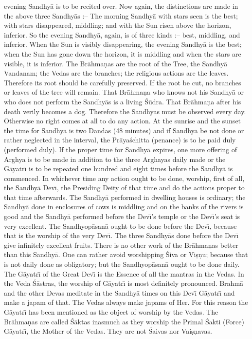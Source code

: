 evening Sandhy\=a is to be recited over. Now again, the distinctions are made in the above three Sandhy\=as :-- The morning Sandhy\=a with stars seen is the best; with stars disappeared, middling; and with the Sun risen above the horizon, inferior. So the evening Sandhy\=a, again, is of three kinds :-- best, middling, and inferior. When the Sun is visibly disappearing, the evening Sandhy\=a is the best; when the Sun has gone down the horizon, it is middling and when the stars are visible, it is inferior. The Br\=ahma\d{n}as are the root of the Tree, the Sandhy\=a Vandanam; the Vedas are the branches; the religious actions are the leaves. Therefore its root should be carefully preserved. If the root be cut, no branches or leaves of the tree will remain. That Br\=ahma\d{n}a who knows not his Sandhy\=a or who does not perform the Sandhy\=as is a living \'S\=udra. That Br\=ahma\d{n}a after his death verily becomes a dog. Therefore the Sandhy\=as must be observed every day. Otherwise no right comes at all to do any action. At the sunrise and the sunset the time for Sandhy\=a is two Dandas (48 minutes) and if Sandhy\=a be not done or rather neglected in the interval, the Pr\=aya\'schitta (penance) is to he paid duly (performed duly). If the proper time for Sandhy\=a expires, one more offering of Arghya is to be made in addition to the three Arghayas daily made or the G\=ayatr\={\i} is to be repeated one hundred and eight times before the Sandhy\=a is commenced. In whichever time any action ought to be done, worship, first of all, the Sandhy\=a Dev\={\i}, the Presiding Deity of that time and do the actions proper to that time afterwards. The Sandhy\=a performed in dwelling houses is ordinary; the Sandhy\=a done in enclosures of cows is middling and on the banks of the rivers is good and the Sandhy\=a performed before the Dev\={\i}'s temple or the Dev\={\i}'s seat is very excellent. The Sandhyop\=asan\=a ought to be done before the Dev\={\i}, because that is the worship of the very Dev\={\i}. The three Sandhy\=as done before the Dev\={\i} give infinitely excellent fruits. There is no other work of the Br\=ahma\d{n}as better than this Sandhy\=a. One can rather avoid worshipping \'Siva or Vi\d{s}\d{n}u; because that is not daily done as obligatory; but the Sandhyop\=asan\=a ought to be done daily. The G\=ayatr\={\i} of the Great Dev\={\i} is the Essence of all the mantras in the Vedas. In the Veda \'S\=astras, the worship of G\=ayatr\={\i} is most definitely pronounced. Brahm\=a and the other Devas meditate in the Sandhy\=a times on this Dev\={\i} G\=ayatr\={\i} and make a japam of that. The Vedas always make japams of Her. For this reason the G\=ayatr\={\i} has been mentioned as the object of worship by the Vedas. The Br\=ahma\d{n}as are called \'S\=aktas inasmuch as they worship the Primal \'Sakti (Force) G\=ayatr\={\i}, the Mother of the Vedas. They are not \'Saivas nor Vai\d{s}\d{n}avas.

